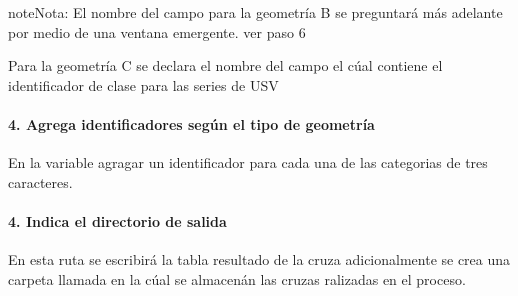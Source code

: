 \documentclass[letterpaper,10pt,spanish]{sphinxmanual}
\begin{document}
\begin{sphinxadmonition}{note}{Nota:}
El nombre del campo para la geometría B se preguntará más adelante
por medio de una ventana emergente. ver paso 6
\end{sphinxadmonition}

Para la geometría C se declara el nombre del campo el cúal contiene el identificador
de clase para las series de USV

\begin{sphinxVerbatim}[commandchars=\\\{\}]
  
\end{sphinxVerbatim}


\paragraph{4. Agrega identificadores según el tipo de geometría}
\label{\detokenize{tabulacion_3geo:agrega-identificadores-segun-el-tipo-de-geometria}}
En la variable  agragar un identificador  para cada una de las
categorias de tres caracteres.

\begin{sphinxVerbatim}[commandchars=\\\{\}]
\PYG{p}{[}\PYG{p}{]}
\end{sphinxVerbatim}


\paragraph{4. Indica el directorio de salida}
\label{\detokenize{tabulacion_3geo:indica-el-directorio-de-salida}}
En esta ruta se escribirá la tabla resultado de la cruza adicionalmente se  crea una carpeta llamada  en la cúal se almacenán
las cruzas ralizadas en el proceso.

\begin{sphinxVerbatim}[commandchars=\\\{\}]
  
\end{sphinxVerbatim}
\end{document}
